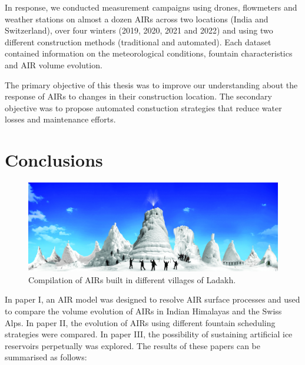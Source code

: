 In response, we conducted measurement campaigns using drones, flowmeters and weather stations on almost a dozen
AIRs across two locations (India and Switzerland), over four winters (2019, 2020, 2021 and 2022) and using two
different construction methods (traditional and automated). Each dataset contained information on the
meteorological conditions, fountain characteristics and AIR volume evolution. 

The primary objective of this thesis was to improve our understanding about the response of AIRs to changes in
their construction location. The secondary objective was to propose automated constuction strategies that reduce
water losses and maintenance efforts.  

\section{Conclusions}

\begin{figure}[htb]
	\includegraphics[width=\textwidth]{figs/AIRs_Ladakh}
	\caption{Compilation of AIRs built in different villages of Ladakh.}
	\label{fig:airs_ladakh}
\end{figure}

In paper I, an AIR model was designed to resolve AIR surface processes and used to compare the volume evolution
of AIRs in Indian Himalayas and the Swiss Alps. In paper II, the evolution of AIRs using different fountain
scheduling strategies were compared. In paper III, the possibility of sustaining artificial ice reservoirs
perpetually was explored. The results of these papers can be summarised as follows:


